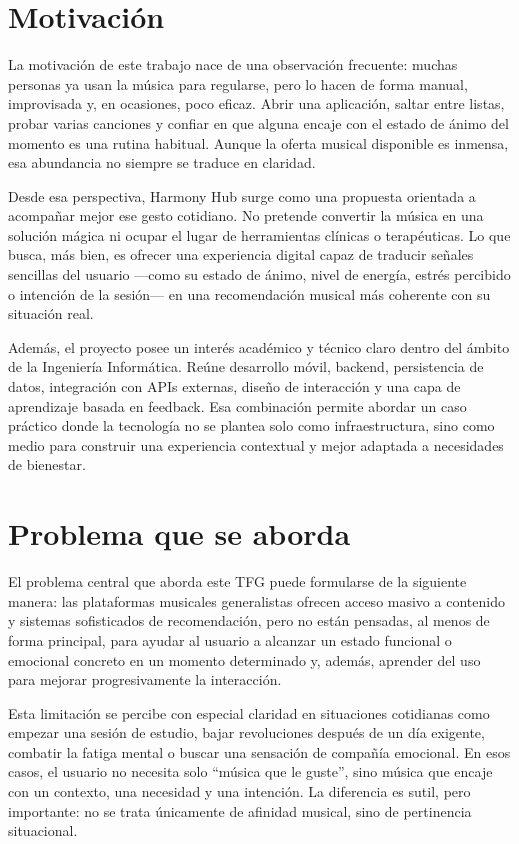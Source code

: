 \section{Motivación}
\label{sec:motivacion}

La motivación de este trabajo nace de una observación frecuente: muchas personas ya usan la música para regularse, pero lo hacen de forma manual, improvisada y, en ocasiones, poco eficaz. Abrir una aplicación, saltar entre listas, probar varias canciones y confiar en que alguna encaje con el estado de ánimo del momento es una rutina habitual. Aunque la oferta musical disponible es inmensa, esa abundancia no siempre se traduce en claridad.

Desde esa perspectiva, Harmony Hub surge como una propuesta orientada a acompañar mejor ese gesto cotidiano. No pretende convertir la música en una solución mágica ni ocupar el lugar de herramientas clínicas o terapéuticas. Lo que busca, más bien, es ofrecer una experiencia digital capaz de traducir señales sencillas del usuario ---como su estado de ánimo, nivel de energía, estrés percibido o intención de la sesión--- en una recomendación musical más coherente con su situación real.

Además, el proyecto posee un interés académico y técnico claro dentro del ámbito de la Ingeniería Informática. Reúne desarrollo móvil, backend, persistencia de datos, integración con APIs externas, diseño de interacción y una capa de aprendizaje basada en feedback. Esa combinación permite abordar un caso práctico donde la tecnología no se plantea solo como infraestructura, sino como medio para construir una experiencia contextual y mejor adaptada a necesidades de bienestar.

\section{Problema que se aborda}
\label{sec:problema_abordado}

El problema central que aborda este TFG puede formularse de la siguiente manera: las plataformas musicales generalistas ofrecen acceso masivo a contenido y sistemas sofisticados de recomendación, pero no están pensadas, al menos de forma principal, para ayudar al usuario a alcanzar un estado funcional o emocional concreto en un momento determinado y, además, aprender del uso para mejorar progresivamente la interacción.

Esta limitación se percibe con especial claridad en situaciones cotidianas como empezar una sesión de estudio, bajar revoluciones después de un día exigente, combatir la fatiga mental o buscar una sensación de compañía emocional. En esos casos, el usuario no necesita solo ``música que le guste'', sino música que encaje con un contexto, una necesidad y una intención. La diferencia es sutil, pero importante: no se trata únicamente de afinidad musical, sino de pertinencia situacional.

